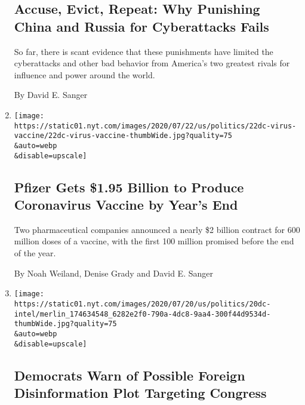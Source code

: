 \begin{enumerate}
  \hypertarget{accuse-evict-repeat-why-punishing-china-and-russia-for-cyberattacks-fails}{%
  \subsection{Accuse, Evict, Repeat: Why Punishing China and Russia for
  Cyberattacks
  Fails}\label{accuse-evict-repeat-why-punishing-china-and-russia-for-cyberattacks-fails}}

  So far, there is scant evidence that these punishments have limited
  the cyberattacks and other bad behavior from America's two greatest
  rivals for influence and power around the world.

  By David E. Sanger
\item
  \href{/2020/07/22/us/politics/pfizer-coronavirus-vaccine.html}{}

  \texttt{[image: https://static01.nyt.com/images/2020/07/22/us/politics/22dc-virus-vaccine/22dc-virus-vaccine-thumbWide.jpg?quality=75\\\&auto=webp\\\&disable=upscale]}

  \hypertarget{pfizer-gets-195-billion-to-produce-coronavirus-vaccine-by-years-end}{%
  \subsection{Pfizer Gets \$1.95 Billion to Produce Coronavirus Vaccine
  by Year's
  End}\label{pfizer-gets-195-billion-to-produce-coronavirus-vaccine-by-years-end}}

  Two pharmaceutical companies announced a nearly \$2 billion contract
  for 600 million doses of a vaccine, with the first 100 million
  promised before the end of the year.

  By Noah Weiland, Denise Grady and David E. Sanger
\item
  \href{/2020/07/20/us/politics/congress-disinformation-biden-russia-ukraine.html}{}

  \texttt{[image: https://static01.nyt.com/images/2020/07/20/us/politics/20dc-intel/merlin\_174634548\_6282e2f0-790a-4dc8-9aa4-300f44d9534d-thumbWide.jpg?quality=75\\\&auto=webp\\\&disable=upscale]}

  \hypertarget{democrats-warn-of-possible-foreign-disinformation-plot-targeting-congress}{%
  \subsection{Democrats Warn of Possible Foreign Disinformation Plot
  Targeting
  Congress}\label{democrats-warn-of-possible-foreign-disinformation-plot-targeting-congress}}


\end{enumerate}
